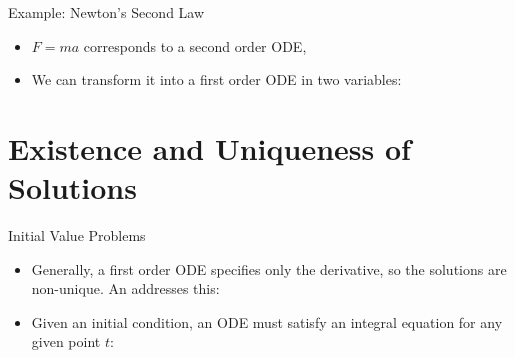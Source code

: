 \begin{frame}{Example: Newton's Second Law}

\begin{itemize}
\item $F=ma$ corresponds to a second order ODE,
\item We can transform it into a first order ODE in two variables:

\tlgcond{
\[\B u = \begin{bmatrix} y(t) \\ y'(t) \end{bmatrix},\]
\[\begin{bmatrix} u_1' \\ u_2' \end{bmatrix} = \B u' = \B f(t,\B u) = \begin{bmatrix} u_2 \\ F/m\end{bmatrix}.\]
}


\end{itemize}

\end{frame}

\section{Existence and Uniqueness of Solutions}
\begin{frame}{Initial Value Problems}

\begin{itemize}
\item Generally, a first order ODE specifies only the derivative, so the solutions are non-unique. An  addresses this:

\item Given an initial condition, an ODE must satisfy an integral equation for any given point $t$:


\end{itemize}

\end{frame}

